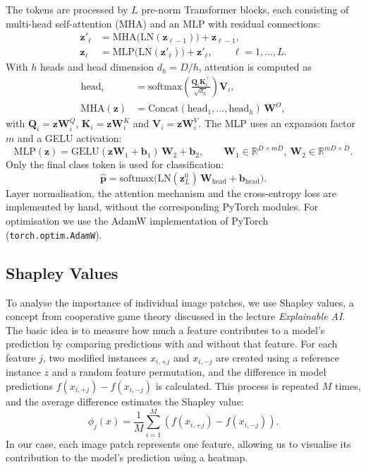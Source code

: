 The tokens are processed by $L$ pre-norm Transformer blocks, each consisting of multi-head self-attention (MHA) and an MLP with residual connections:
\begin{align}
\mathbf{z}'_\ell &= \mathrm{MHA}\big(\mathrm{LN}(\mathbf{z}_{\ell-1})\big) + \mathbf{z}_{\ell-1}, \\
\mathbf{z}_\ell  &= \mathrm{MLP}\big(\mathrm{LN}(\mathbf{z}'_\ell)\big) + \mathbf{z}'_\ell, \qquad \ell=1,\dots,L .
\end{align}
With $h$ heads and head dimension $d_h=D/h$, attention is computed as
\begin{align}
\mathrm{head}_i &= \mathrm{softmax}\!\left(\frac{\mathbf{Q}_i\mathbf{K}_i^{\top}}{\sqrt{d_h}}\right)\mathbf{V}_i, \\
\mathrm{MHA}(\mathbf{z}) &= \mathrm{Concat}(\mathrm{head}_1,\dots,\mathrm{head}_h)\,\mathbf{W}^{O},
\end{align}
with $\mathbf{Q}_i=\mathbf{z}\mathbf{W}_i^{Q}$, $\mathbf{K}_i=\mathbf{z}\mathbf{W}_i^{K}$ and $\mathbf{V}_i=\mathbf{z}\mathbf{W}_i^{V}$. The MLP uses an expansion factor $m$ and a GELU activation:
\begin{equation}
\mathrm{MLP}(\mathbf{z}) = \mathrm{GELU}(\mathbf{z}\mathbf{W}_1+\mathbf{b}_1)\,\mathbf{W}_2+\mathbf{b}_2,
\qquad \mathbf{W}_1\in\mathbb{R}^{D\times mD},\ \mathbf{W}_2\in\mathbb{R}^{mD\times D}.
\end{equation}
Only the final class token is used for classification:
\begin{equation}
\hat{\mathbf{p}} = \mathrm{softmax}\!\big(\mathrm{LN}(\mathbf{z}_L^{0})\,\mathbf{W}_{\mathrm{head}}+\mathbf{b}_{\mathrm{head}}\big).
\end{equation}
Layer normalisation, the attention mechanism and the cross-entropy loss are implemented by hand, without the corresponding PyTorch modules. For optimisation we use the AdamW implementation of PyTorch (\texttt{torch.optim.AdamW}).

\subsection{Shapley Values}\label{sec:shapley}

To analyse the importance of individual image patches, we use Shapley values, a concept from cooperative game theory discussed in the lecture \textit{Explainable AI}. The basic idea is to measure how much a feature contributes to a model's prediction by comparing predictions with and without that feature. For each feature $j$, two modified instances $x_{i,+j}$ and $x_{i,-j}$ are created using a reference instance $z$ and a random feature permutation, and the difference in model predictions $f(x_{i,+j}) - f(x_{i,-j})$ is calculated. This process is repeated $M$ times, and the average difference estimates the Shapley value:
\[
\phi_j(x) = \frac{1}{M}\sum_{i=1}^{M}
\left(f(x_{i,+j})-f(x_{i,-j})\right).
\]
In our case, each image patch represents one feature, allowing us to visualise its contribution to the model's prediction using a heatmap.


